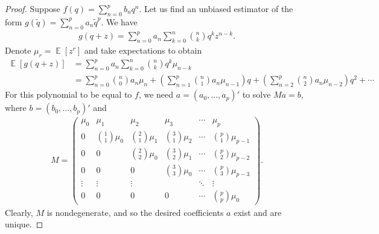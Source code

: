 \documentclass[11pt]{article}
\newcommand{\E}{\operatorname{\mathbb{E}}}
\begin{document}
\begin{proof}
Suppose $f(q) = \sum_{n=0}^p b_n q^n$.
Let us find an unbiased estimator of the form $g(\tilde q) = \sum_{n=0}^p a_n \tilde q^p$. We have
\begin{align}
g(q+z) = \sum_{n=0}^p a_n \sum_{k=0}^n \binom{n}{k} q^k z^{n-k}.
\end{align}
Denote $\mu_r = \E[z^r]$ and take expectations to obtain
\begin{align}
\E[g(q+z)] &= \sum_{n=0}^p a_n \sum_{k=0}^n \binom{n}{k} q^k \mu_{n-k} \\    
&= \sum_{n=0}^p \binom{n}{0} a_n\mu_n + \left(\sum_{n=1}^p \binom{n}{1} a_n \mu_{n-1} \right) q + \left(\sum_{n=2}^p \binom{n}{2} a_n \mu_{n-2} \right) q^2 + \cdots 
\end{align}
For this polynomial to be equal to $f$, we need $a=(a_0,\dots,a_p)'$ to solve $M a = b$, where $b=(b_0,\dots,b_p)'$ and
\begin{align}
    M = 
    \begin{pmatrix}
        \mu_0 & \mu_1 & \mu_2 & \mu_3 & \cdots & \mu_p \\
        0     & \binom{1}{1} \mu_0 & \binom{2}{1} \mu_1 & \binom{3}{1} \mu_2 & \cdots & \binom{p}{1} \mu_{p-1} \\
        0 & 0 & \binom{2}{2}\mu_0 & \binom{3}{2} \mu_1 & \cdots & \binom{p}{2}\mu_{p-2} \\
        0 & 0 & 0 & \binom{3}{3} \mu_0 & \cdots & \binom{p}{3} \mu_{p-3} \\
        \vdots & \vdots & \vdots & & \ddots & \vdots \\
        0 & 0 & 0 & 0 & \cdots & \binom{p}{p} \mu_0
    \end{pmatrix}
    .
\end{align}
Clearly, $M$ is nondegenerate, and so the desired coefficients $a$ exist and are unique.
\end{proof}
\end{document}
